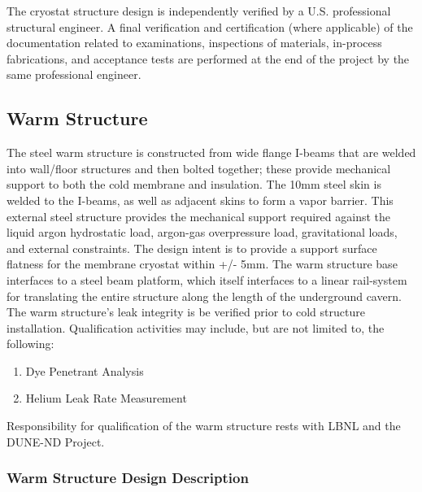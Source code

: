The  cryostat structure design is independently verified by a U.S. professional structural engineer.
A final verification and certification (where applicable) of the documentation related to examinations, inspections of materials, in-process fabrications, and acceptance tests are performed at the end of the project by the same professional engineer.


\subsection{Warm Structure}
\label{sec:cryost-des-warm}
The steel warm structure is constructed from wide flange I-beams that are welded into wall/floor structures and then bolted together; these provide mechanical support to both the cold membrane and insulation.  The 10mm steel skin is welded to the I-beams, as well as adjacent skins to form a vapor barrier.  This external steel structure provides the mechanical support required against the liquid argon hydrostatic load, argon-gas overpressure load, gravitational loads, and external constraints. The design intent is to provide a support surface flatness for the membrane cryostat within +/- 5mm.
The warm structure base interfaces to a steel beam platform, which itself interfaces to a linear rail-system for translating the entire structure along the length of the underground cavern.
The warm structure’s leak integrity is be verified prior to cold structure installation.  Qualification activities may include, but are not limited to, the following:
\begin{enumerate}
    \item Dye Penetrant Analysis
    \item Helium Leak Rate Measurement 
\end{enumerate}
Responsibility for qualification of the warm structure rests with LBNL and the DUNE-ND Project.

\subsubsection{Warm Structure Design Description}
\label{sec:cryost-des-warm-design}

